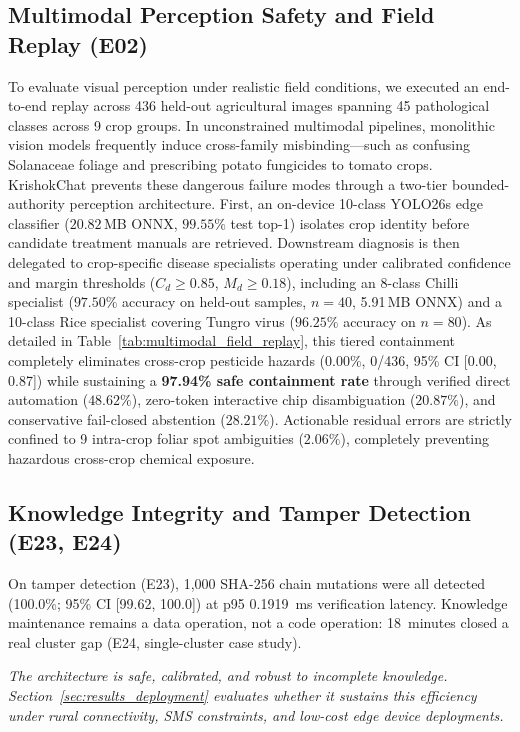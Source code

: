 \subsection{Multimodal Perception Safety and Field Replay (E02)}
To evaluate visual perception under realistic field conditions, we executed an end-to-end replay across 436 held-out agricultural images spanning 45 pathological classes across 9 crop groups. In unconstrained multimodal pipelines, monolithic vision models frequently induce cross-family misbinding---such as confusing Solanaceae foliage and prescribing potato fungicides to tomato crops. KrishokChat prevents these dangerous failure modes through a two-tier bounded-authority perception architecture. First, an on-device 10-class YOLO26s edge classifier ($20.82$\,MB ONNX, $99.55\%$ test top-1) isolates crop identity before candidate treatment manuals are retrieved. Downstream diagnosis is then delegated to crop-specific disease specialists operating under calibrated confidence and margin thresholds ($C_d \ge 0.85$, $M_d \ge 0.18$), including an 8-class Chilli specialist ($97.50\%$ accuracy on held-out samples, $n=40$, 5.91\,MB ONNX) and a 10-class Rice specialist covering Tungro virus ($96.25\%$ accuracy on $n=80$). As detailed in Table~\ref{tab:multimodal_field_replay}, this tiered containment completely eliminates cross-crop pesticide hazards ($0.00\%$, 0/436, 95\% CI [0.00, 0.87]) while sustaining a \textbf{97.94\% safe containment rate} through verified direct automation ($48.62\%$), zero-token interactive chip disambiguation ($20.87\%$), and conservative fail-closed abstention ($28.21\%$). Actionable residual errors are strictly confined to 9 intra-crop foliar spot ambiguities ($2.06\%$), completely preventing hazardous cross-crop chemical exposure.



\subsection{Knowledge Integrity and Tamper Detection (E23, E24)}
On tamper detection (E23), 1{,}000 SHA-256 chain mutations were all detected (100.0\%; 95\% CI [99.62, 100.0]) at p95 0.1919~ms verification latency. Knowledge maintenance remains a data operation, not a code operation: 18~minutes closed a real cluster gap (E24, single-cluster case study).

\medskip
\noindent\textit{The architecture is safe, calibrated, and robust to incomplete knowledge. Section~\ref{sec:results_deployment} evaluates whether it sustains this efficiency under rural connectivity, SMS constraints, and low-cost edge device deployments.}